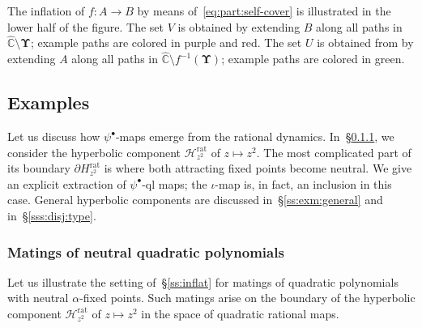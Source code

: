 \documentclass{amsart}
\newcommand{\1}{{\mathbb 1 }}
\newcommand{\bUpsilon}{{\mathbf \Upsilon}}
\newcommand{\wC}{\widehat{\mathbb{C}}}
\theoremstyle{remark}
\numberwithin{equation}{section}
\theoremstyle{definition}
\begin{document}
The inflation of $f\colon A\to B$ by means of~\eqref{eq:part:self-cover} is illustrated in the lower half of the figure. The set $V$ is obtained by extending $B$ along all paths in $\wC\setminus \bUpsilon$; example paths are colored in purple and red. The set $U$ is obtained from by extending $A$ along all paths in $\wC\setminus f^{-1}(\bUpsilon)$; example paths are colored in green.



\subsection{Examples}\label{ss:exms} Let us discuss how $\psi^\bullet$-maps emerge from the rational dynamics. In~\S\ref{exm:C1}, we consider the hyperbolic component $ \mathcal H^\text{rat}_{z^2}$ of $z\mapsto z^2$. The most complicated part of its boundary $\partial H^\text{rat}_{z^2}$ is where both attracting fixed points become neutral. We give an explicit extraction of $\psi^\bullet$-ql maps; the $\iota$-map is, in fact, an inclusion in this case. General hyperbolic components are discussed in~\S\ref{ss:exm:general} and in~\S\ref{sss:disj:type}.


\subsubsection{Matings of neutral quadratic polynomials}\label{exm:C1} Let us illustrate the setting of~\S\ref{ss:inflat} for matings of quadratic polynomials with neutral $\alpha$-fixed points. Such matings arise on the boundary of the hyperbolic component $\mathcal H^\text{rat}_{z^2}$ of $z\mapsto z^2$ in the space of quadratic rational maps. 
\end{document}
